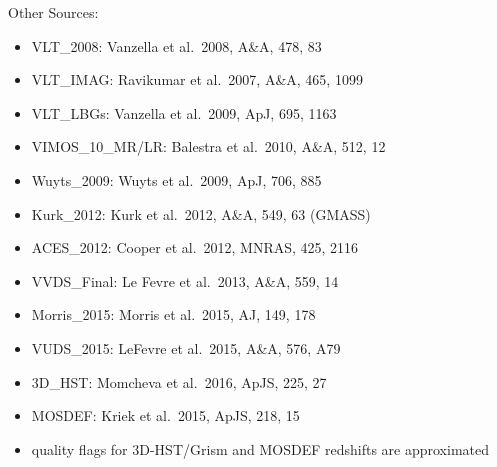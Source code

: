 \documentclass[12pt,onecolumn]{article}
\begin{document}
\noindent Other Sources:
\begin{itemize}
\item VLT\_2008: Vanzella et al.\ 2008, A\&A, 478, 83
\item VLT\_IMAG: Ravikumar et al.\ 2007, A\&A, 465, 1099
\item VLT\_LBGs: Vanzella et al.\ 2009, ApJ, 695, 1163
\item VIMOS\_10\_MR/LR: Balestra et al.\ 2010, A\&A, 512, 12  %
\item Wuyts\_2009: Wuyts et al.\ 2009, ApJ, 706, 885          %
\item Kurk\_2012: Kurk et al.\ 2012, A\&A, 549, 63 (GMASS)
\item ACES\_2012: Cooper et al.\ 2012, MNRAS, 425, 2116
\item VVDS\_Final: Le Fevre et al.\ 2013, A\&A, 559, 14       %
\item Morris\_2015: Morris et al.\ 2015, AJ, 149, 178         %
\item VUDS\_2015: LeFevre et al.\ 2015, A\&A, 576, A79
\item 3D\_HST: Momcheva et al.\ 2016, ApJS, 225, 27
\item MOSDEF: Kriek et al.\ 2015, ApJS, 218, 15
\item quality flags for 3D-HST/Grism and MOSDEF redshifts are approximated
\end{itemize}
\end{document}
